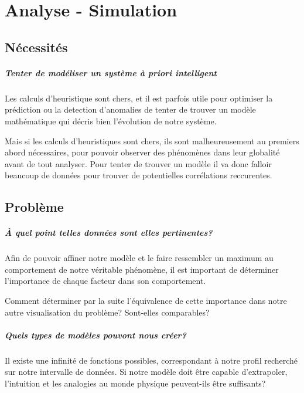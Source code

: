 \chapter{Analyse - Simulation}
	
	
	\section{Nécessités}
	
		\paragraph{Tenter de modéliser un système à priori intelligent}
		Les calculs d'heuristique sont chers, et il est parfois utile pour optimiser la prédiction ou la detection d'anomalies de tenter de trouver un modèle mathématique qui décris bien l'évolution de notre système.
		
		Mais si les calculs d'heuristiques sont chers, ils sont malheureusement au premiers abord nécessaires, pour pouvoir observer des phénomènes dans leur globalité avant de tout analyser. Pour tenter de trouver un modèle il va donc falloir beaucoup de données pour trouver de potentielles corrélations reccurentes.
 
	
	\section{Problème}
	
		\paragraph{À quel point telles données sont elles pertinentes?}
		Afin de pouvoir affiner notre modèle et le faire ressembler un maximum au comportement de notre véritable phénomène, il est important de déterminer l'importance de chaque facteur dans son comportement.
		
		Comment déterminer par la suite l'équivalence de cette importance dans notre autre visualisation du problème? Sont-elles comparables?
		
		\paragraph{Quels types de modèles pouvont nous créer?}
		Il existe une infinité de fonctions possibles, correspondant à notre profil recherché sur notre intervalle de données.
		Si notre modèle doit être capable d'extrapoler, l'intuition et les analogies au monde physique peuvent-ils être suffisants? 
		
